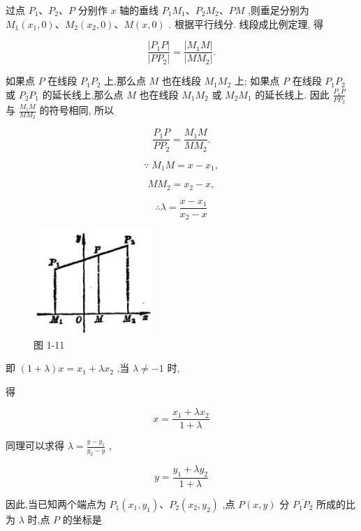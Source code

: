 \documentclass[lang=cn,newtx,10pt,scheme=chinese]{elegantbook}
\begin{document}
过点 \({P}_{1}\text{、}{P}_{2}\text{、}P\) 分别作 \(x\) 轴的垂线 \({P}_{1}{M}_{1}\text{、}{P}_{2}{M}_{2}\text{、}{PM}\) ,则垂足分别为 \({M}_{1}\left( {{x}_{1},0}\right) \text{、}{M}_{2}\left( {{x}_{2},0}\right) \text{、}M\left( {x,0}\right)\) . 根据平行线分. 线段成比例定理, 得

\[
  \frac{\left| {P}_{1}P\right| }{\left| P{P}_{2}\right| } = \frac{\left| {M}_{1}M\right| }{\left| M{M}_{2}\right| }.
\]

如果点 \(P\) 在线段 \({P}_{1}{P}_{2}\) 上,那么点 \(M\) 也在线段 \({M}_{1}{M}_{2}\) 上; 如果点 \(P\) 在线段 \({P}_{1}{P}_{2}\) 或 \({P}_{2}{P}_{1}\) 的延长线上,那么点 \(M\) 也在线段 \({M}_{1}{M}_{2}\) 或 \({M}_{2}{M}_{1}\) 的延长线上. 因此 \(\frac{{P}_{1}P}{P{P}_{2}}\) 与 \(\frac{{M}_{1}M}{M{M}_{2}}\) 的符号相同, 所以

\[
  \frac{{P}_{1}P}{P{P}_{2}} = \frac{{M}_{1}M}{M{M}_{2}}.
\]

\[
  \because \;{M}_{1}M = x - {x}_{1},
\]

\[
  M{M}_{2} = {x}_{2} - x,
\]

\[
  \therefore \lambda = \frac{x - {x}_{1}}{{x}_{2} - x}
\]

\begin{figure}[h]
  \centering
  \includegraphics[max width=0.4\textwidth]{images/01912cc2-ffb6-728e-9ae7-b113ff05c64b_13_700827.jpg}
  \caption{图 1-11}
\end{figure}



即 \(\left( {1 + \lambda }\right) x = {x}_{1} + \lambda {x}_{2}\) ,当 \(\lambda \neq - 1\) 时,

得

\[
  x = \frac{{x}_{1} + \lambda {x}_{2}}{1 + \lambda }
\]

同理可以求得 \(\lambda = \frac{y - {y}_{1}}{{y}_{2} - y}\) ,

\[
  y = \frac{{y}_{1} + \lambda {y}_{2}}{1 + \lambda }
\]

因此,当已知两个端点为 \({P}_{1}\left( {{x}_{1},{y}_{1}}\right) \text{、}{P}_{2}\left( {{x}_{2},{y}_{2}}\right)\) ,点 \(P\left( {x,y}\right)\) 分 \(\overline{{P}_{1}{P}_{2}}\) 所成的比为 \(\lambda\) 时,点 \(P\) 的坐标是
\end{document}
